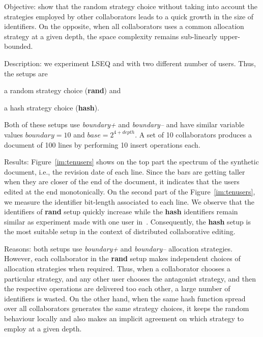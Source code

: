 \begin{asparadesc}
\item[Objective:] show that the random strategy choice without taking into
  account the strategies employed by other collaborators leads to a quick
  growth in the size of identifiers. On the opposite, when all collaborators
  uses a common allocation strategy at a given depth, the space complexity
  remains sub-linearly upper-bounded.

\item[Description:] we experiment LSEQ and \NAME{} with two different number of
  users. Thus, the setups are
  \begin{inparaenum}[(i)]
  \item a random strategy choice (\textbf{rand}) and
  \item a hash strategy choice (\textbf{hash}).
  \end{inparaenum}
  Both of these setups use \emph{boundary+} and \emph{boundary--} and have
  similar variable values $boundary=10$ and $base=2^{4+depth}$. A set of 10
  collaborators produces a document of 100 lines by performing 10 insert
  operations each.

\item[Results:] Figure~\ref{im:tenusers} shows on the top part the spectrum of
  the synthetic document, i.e., the revision date of each line. Since the bars
  are getting taller when they are closer of the end of the document, it
  indicates that the users edited at the end monotonically. On the second part
  of the Figure~\ref{im:tenusers}, we measure the identifier bit-length
  associated to each line. We observe that the identifiers of \textbf{rand}
  setup quickly increase while the \textbf{hash} identifiers remain similar as
  experiment made with one user in~\cite{nedelec2013lseq}. Consequently, the
  \textbf{hash} setup is the most suitable setup in the context of distributed
  collaborative editing.

\item[Reasons:] both setups use \emph{boundary+} and \emph{boundary--}
  allocation strategies. However, each collaborator in the \textbf{rand} setup
  makes independent choices of allocation strategies when required. Thus, when
  a collaborator chooses a particular strategy, and any other user chooses the
  antagonist strategy, and then the respective operations are delivered too
  each other, a large number of identifiers is wasted. On the other hand, when
  the same hash function spread over all collaborators generates the same
  strategy choices, it keeps the random behaviour locally and also makes an
  implicit agreement on which strategy to employ at a given depth.
\end{asparadesc}

